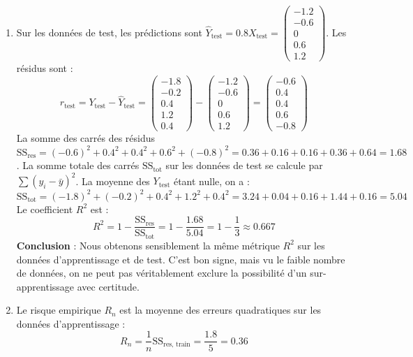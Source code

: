 \documentclass[]{../exercices}
\begin{document}
\begin{solution}
\begin{enumerate}
		\item Sur les données de test, les prédictions sont $\hat{Y}_{\text{test}} = 0.8 X_{\text{test}} = \begin{pmatrix} -1.2 \\ -0.6 \\ 0 \\ 0.6 \\ 1.2 \end{pmatrix}$.
		Les résidus sont :
		\[
		r_{\text{test}} = Y_{\text{test}} - \hat{Y}_{\text{test}} = \begin{pmatrix} -1.8 \\ -0.2 \\ 0.4 \\ 1.2 \\ 0.4 \end{pmatrix} - \begin{pmatrix} -1.2 \\ -0.6 \\ 0 \\ 0.6 \\ 1.2 \end{pmatrix} = \begin{pmatrix} -0.6 \\ 0.4 \\ 0.4 \\ 0.6 \\ -0.8 \end{pmatrix}
		\]
        La somme des carrés des résidus $\text{SS}_{\text{res}} = (-0.6)^2 + 0.4^2 + 0.4^2 + 0.6^2 + (-0.8)^2 = 0.36 + 0.16 + 0.16 + 0.36 + 0.64 = 1.68$.
		La somme totale des carrés $\text{SS}_{\text{tot}}$ sur les données de test se calcule par $\sum (y_i - \bar{y})^2$. La moyenne des $Y_{\text{test}}$ étant nulle, on a :
		\[
		\text{SS}_{\text{tot}} = (-1.8)^2 + (-0.2)^2 + 0.4^2 + 1.2^2 + 0.4^2 = 3.24 + 0.04 + 0.16 + 1.44 + 0.16 = 5.04
		\]
		Le coefficient $R^2$ est :
		\[
		R^2 = 1 - \frac{\text{SS}_{\text{res}}}{\text{SS}_{\text{tot}}} = 1 - \frac{1.68}{5.04} = 1 - \frac{1}{3} \approx 0.667
		\]
		\textbf{Conclusion} : Nous obtenons sensiblement la même métrique $R^2$ sur les données d'apprentissage et de test. C'est bon signe, mais vu le faible nombre de données, on ne peut pas véritablement exclure la possibilité d'un sur-apprentissage avec certitude.

		\item Le risque empirique $R_n$ est la moyenne des erreurs quadratiques sur les données d'apprentissage :
		\[
		R_n = \frac{1}{n} \text{SS}_{\text{res, train}} = \frac{1.8}{5} = 0.36
		\]


\end{enumerate}
\end{solution}
\end{document}
